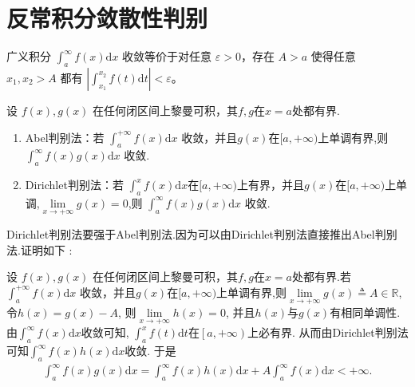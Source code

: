 \documentclass[../../main.tex]{subfiles}
\begin{document}
\section{反常积分敛散性判别}

\begin{theorem}[Cauchy收敛准则]
广义积分 \(\int_{a}^{\infty} f(x) \mathrm{d}x\) 收敛等价于对任意 \(\varepsilon > 0\)，存在 \(A > a\) 使得任意 \(x_1,x_2 > A\) 都有 \(\left|\int_{x_1}^{x_2} f(t) \mathrm{d}t\right| < \varepsilon\)。 
\end{theorem}

\begin{theorem}[A-D判别法]\label{theorem:A-D判别法}
设 \(f(x),g(x)\) 在任何闭区间上黎曼可积，其$f,g$在$x=a$处都有界.
\begin{enumerate}
\item {\heiti Abel判别法}：若 \(\int_{a}^{+\infty} f(x) \mathrm{d}x\) 收敛，并且$g(x)$在$[a,+\infty)$上单调有界,则 \(\int_{a}^{\infty} f(x)g(x) \mathrm{d}x\) 收敛.

\item {\heiti Dirichlet判别法}：若 \(\int_{a}^{x} f(x) \mathrm{d}x\)在$[a,+\infty)$上有界，并且\(g(x)\)在\([a,+\infty)\)上单调,$\underset{x\rightarrow +\infty}{\lim}g\left( x \right) =0$,则 \(\int_{a}^{\infty} f(x)g(x) \mathrm{d}x\) 收敛.
\end{enumerate}
\end{theorem}
\begin{remark}
Dirichlet判别法要强于Abel判别法.因为可以由Dirichlet判别法直接推出Abel判别法.证明如下 :

设 \(f(x),g(x)\) 在任何闭区间上黎曼可积，其$f,g$在$x=a$处都有界.若 \(\int_{a}^{+\infty} f(x) \mathrm{d}x\) 收敛，并且$g(x)$在$[a,+\infty)$上单调有界,则$\lim\limits_{x\rightarrow +\infty}g\left( x \right) \triangleq A\in \mathbb{R} $, 令$h\left( x \right) =g\left( x \right) -A$, 则$\lim\limits_{x\rightarrow +\infty}h\left( x \right) =0$, 并且$h\left( x \right) $与$g\left( x \right) $有相同单调性. 由$\int_a^{\infty}{f\left( x \right)}\mathrm{d}x$收敛可知, $\int_a^x{f\left( t \right)}\mathrm{d}t$在$\left[ a,+\infty \right) $上必有界. 从而由Dirichlet判别法可知$\int_a^{\infty}{f\left( x \right) h\left( x \right)}\mathrm{d}x$收敛. 于是
\begin{align*}
\int_a^{\infty}{f\left( x \right) g\left( x \right)}\mathrm{d}x=\int_a^{\infty}{f\left( x \right) h\left( x \right)}\mathrm{d}x+A\int_a^{\infty}{f\left( x \right)}\mathrm{d}x<+\infty .
\end{align*}
\end{remark}
\end{document}
